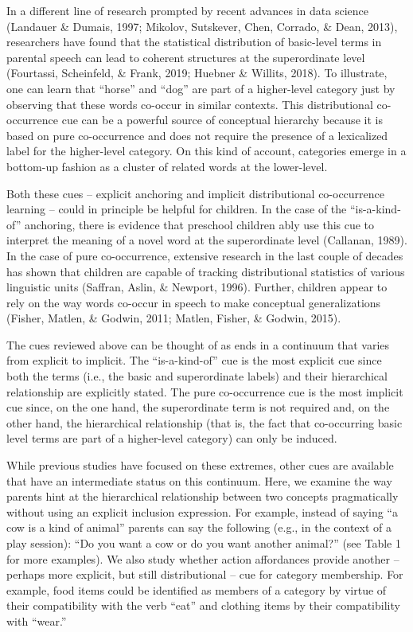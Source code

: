 \documentclass[english,,man,floatsintext]{apa6}
\begin{document}
In a different line of research prompted by recent advances in data science (Landauer \& Dumais, 1997; Mikolov, Sutskever, Chen, Corrado, \& Dean, 2013), researchers
have found that the statistical distribution of basic-level terms in parental speech can lead to coherent structures at the superordinate level (Fourtassi, Scheinfeld, \& Frank, 2019; Huebner \& Willits, 2018). To illustrate, one can learn that \enquote{horse} and \enquote{dog} are part of a higher-level category just by observing that these words co-occur in
similar contexts. This distributional co-occurrence cue can be a powerful source of conceptual hierarchy because it is based on pure co-occurrence and does not require
the presence of a lexicalized label for the higher-level category. On this kind of account, categories emerge in a bottom-up fashion as a cluster of related words at
the lower-level.

Both these cues -- explicit anchoring and implicit distributional co-occurrence learning -- could in principle be helpful for children. In the case of
the \enquote{is-a-kind-of} anchoring, there is evidence that preschool children ably use this cue to interpret the meaning of a novel word at the superordinate level (Callanan, 1989). In the case of pure co-occurrence, extensive research in the last couple of decades has shown that children are capable of tracking distributional statistics of various linguistic units (Saffran, Aslin, \& Newport, 1996). Further, children appear to rely on the way words co-occur in speech to make conceptual generalizations (Fisher, Matlen, \& Godwin, 2011; Matlen, Fisher, \& Godwin, 2015).

The cues reviewed above can be thought of as ends in a continuum that varies from explicit to implicit. The \enquote{is-a-kind-of} cue is the most explicit cue since both the terms (i.e., the basic and superordinate labels) and their hierarchical relationship are explicitly stated. The pure co-occurrence cue is the most implicit cue since, on the one hand,
the superordinate term is not required and, on the other hand, the hierarchical relationship (that is, the fact that co-occurring basic level terms are part of a higher-level category) can only be induced.

While previous studies have focused on these extremes, other cues are available that have an intermediate status on this continuum. Here, we examine the way parents hint at the hierarchical relationship between two concepts pragmatically without using an explicit inclusion expression. For example, instead of saying \enquote{a cow is a kind of animal} parents can say the following (e.g., in the context of a play session): \enquote{Do you want a cow or do you want another animal?} (see Table 1 for more examples). We also study whether action affordances provide another -- perhaps more explicit, but still distributional -- cue for category membership. For example, food items could be identified as members of a category by virtue of their compatibility with the verb \enquote{eat} and clothing items by their compatibility with \enquote{wear.}
\end{document}
